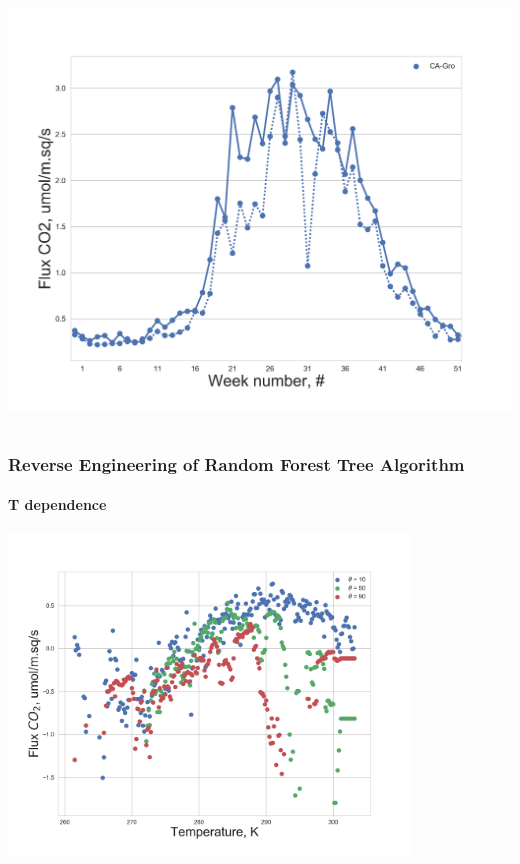 \documentclass{beamer}
\begin{document}
\begin{frame}
\begin{columns}[t]
\includegraphics[width=\textwidth]{F_ML_train_all/0.png}
\end{columns}

\end{frame}





\begin{frame}
\frametitle{Reverse Engineering of Random Forest Tree Algorithm}
\framesubtitle{T dependence}
\centering
\includegraphics[width=0.8\textwidth]{T_dependence.png}\\
\end{frame}
\end{document}
